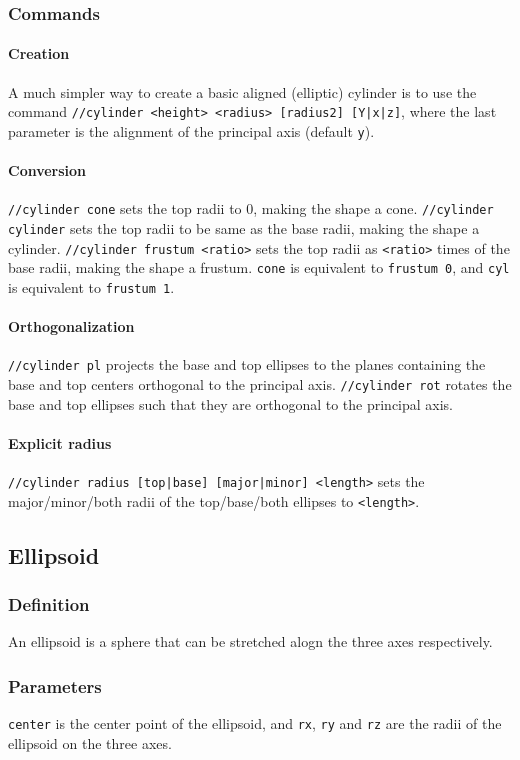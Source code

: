 \documentclass{report}
\begin{document}
				\subsubsection{Commands}
					\paragraph{Creation} A much simpler way to create a basic aligned (elliptic) cylinder is to use the
					command \texttt{//cylinder <height> <radius> [radius2] [Y|x|z]}, where the last parameter is the
					alignment of the principal axis (default \texttt{y}).
					\paragraph{Conversion} \texttt{//cylinder cone} sets the top radii to 0, making the shape a cone.
					\texttt{//cylinder cylinder} sets the top radii to be same as the base radii, making the shape a
					cylinder. \texttt{//cylinder frustum <ratio>} sets the top radii as \texttt{<ratio>} times of the
					base radii, making the shape a frustum. \texttt{cone} is equivalent to \texttt{frustum 0}, and
					\texttt{cyl} is equivalent to \texttt{frustum 1}.
					\paragraph{Orthogonalization} \texttt{//cylinder pl} projects the base and top ellipses to the
					planes containing the base and top centers orthogonal to the principal axis. \texttt{//cylinder rot}
					rotates the base and top ellipses such that they are orthogonal to the principal axis.
					\paragraph{Explicit radius} \texttt{//cylinder radius [top|base] [major|minor] <length>} sets the
					major/minor/both radii of the top/base/both ellipses to \texttt{<length>}.

			\subsection{Ellipsoid}
				\subsubsection{Definition} An ellipsoid is a sphere that can be stretched alogn the three axes respectively.
				\subsubsection{Parameters} \texttt{center} is the center point of the ellipsoid, and \texttt{rx},
				\texttt{ry} and \texttt{rz} are the radii of the ellipsoid on the three axes.
\end{document}
